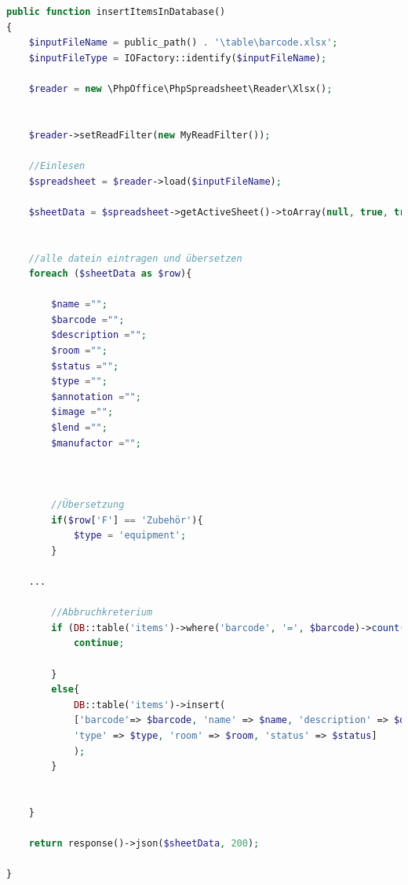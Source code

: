 \begin{lstlisting}[language=php, frame=single]
public function insertItemsInDatabase()
{
	$inputFileName = public_path() . '\table\barcode.xlsx';
	$inputFileType = IOFactory::identify($inputFileName);
	
	$reader = new \PhpOffice\PhpSpreadsheet\Reader\Xlsx();
	
	
	$reader->setReadFilter(new MyReadFilter());
	
	//Einlesen
	$spreadsheet = $reader->load($inputFileName);
	
	$sheetData = $spreadsheet->getActiveSheet()->toArray(null, true, true, true);
	
	
	//alle datein eintragen und übersetzen
	foreach ($sheetData as $row){
		
		$name ="";
		$barcode ="";
		$description ="";
		$room ="";
		$status ="";
		$type ="";
		$annotation ="";
		$image ="";
		$lend ="";
		$manufactor ="";
		
		
		
		//Übersetzung
		if($row['F'] == 'Zubehör'){
			$type = 'equipment';
		}
	
	...	
		
		//Abbruchkreterium
		if (DB::table('items')->where('barcode', '=', $barcode)->count() > 0) {
			continue;
			
		}
		else{
			DB::table('items')->insert(
			['barcode'=> $barcode, 'name' => $name, 'description' => $description,
			'type' => $type, 'room' => $room, 'status' => $status]
			);
		}
			
		
	}
	
	return response()->json($sheetData, 200);
	
}
\end{lstlisting}


